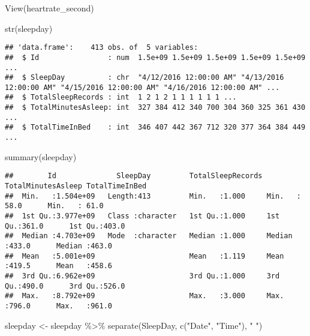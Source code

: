 \documentclass[
]{article}
\newenvironment{Shaded}{\begin{snugshade}}{\end{snugshade}}
\newcommand{\FunctionTok}[1]{\textcolor[rgb]{0.00,0.00,0.00}{#1}}
\newcommand{\NormalTok}[1]{#1}
\newcommand{\OtherTok}[1]{\textcolor[rgb]{0.56,0.35,0.01}{#1}}
\newcommand{\SpecialCharTok}[1]{\textcolor[rgb]{0.00,0.00,0.00}{#1}}
\newcommand{\StringTok}[1]{\textcolor[rgb]{0.31,0.60,0.02}{#1}}
\begin{document}
\begin{Shaded}
\begin{Highlighting}[]
\FunctionTok{View}\NormalTok{(heartrate\_second)}

\FunctionTok{str}\NormalTok{(sleepday)}
\end{Highlighting}
\end{Shaded}

\begin{verbatim}
## 'data.frame':    413 obs. of  5 variables:
##  $ Id                : num  1.5e+09 1.5e+09 1.5e+09 1.5e+09 1.5e+09 ...
##  $ SleepDay          : chr  "4/12/2016 12:00:00 AM" "4/13/2016 12:00:00 AM" "4/15/2016 12:00:00 AM" "4/16/2016 12:00:00 AM" ...
##  $ TotalSleepRecords : int  1 2 1 2 1 1 1 1 1 1 ...
##  $ TotalMinutesAsleep: int  327 384 412 340 700 304 360 325 361 430 ...
##  $ TotalTimeInBed    : int  346 407 442 367 712 320 377 364 384 449 ...
\end{verbatim}

\begin{Shaded}
\begin{Highlighting}[]
\FunctionTok{summary}\NormalTok{(sleepday)}
\end{Highlighting}
\end{Shaded}

\begin{verbatim}
##        Id              SleepDay         TotalSleepRecords TotalMinutesAsleep TotalTimeInBed 
##  Min.   :1.504e+09   Length:413         Min.   :1.000     Min.   : 58.0      Min.   : 61.0  
##  1st Qu.:3.977e+09   Class :character   1st Qu.:1.000     1st Qu.:361.0      1st Qu.:403.0  
##  Median :4.703e+09   Mode  :character   Median :1.000     Median :433.0      Median :463.0  
##  Mean   :5.001e+09                      Mean   :1.119     Mean   :419.5      Mean   :458.6  
##  3rd Qu.:6.962e+09                      3rd Qu.:1.000     3rd Qu.:490.0      3rd Qu.:526.0  
##  Max.   :8.792e+09                      Max.   :3.000     Max.   :796.0      Max.   :961.0
\end{verbatim}

\begin{Shaded}
\begin{Highlighting}[]
\NormalTok{sleepday }\OtherTok{\textless{}{-}} 
\NormalTok{  sleepday }\SpecialCharTok{\%\textgreater{}\%}
  \FunctionTok{separate}\NormalTok{(SleepDay, }\FunctionTok{c}\NormalTok{(}\StringTok{"Date"}\NormalTok{, }\StringTok{"Time"}\NormalTok{), }\StringTok{" "}\NormalTok{)}
\end{Highlighting}
\end{Shaded}
\end{document}
